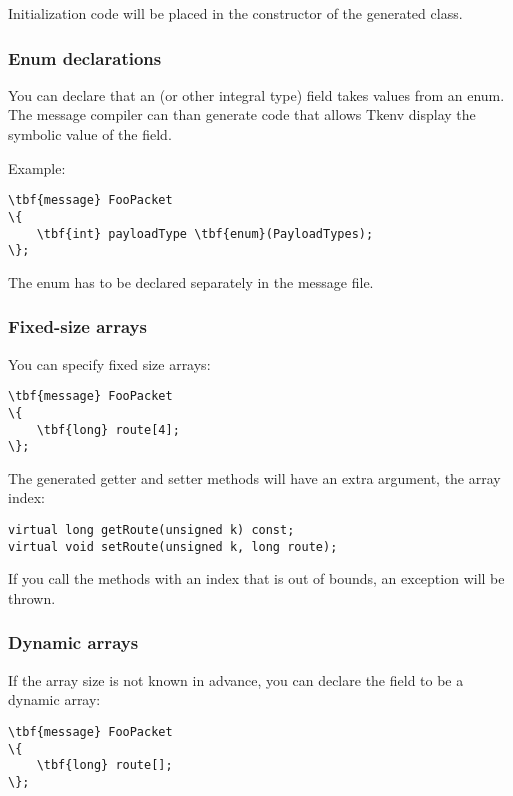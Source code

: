Initialization code will be placed in the constructor of the generated class.


\subsubsection{Enum declarations}

You can declare that an  (or other integral type) field
takes values from an enum. The message compiler can than generate code
that allows Tkenv display the symbolic value of the field.

Example:

\begin{Verbatim}[commandchars=\\\{\}]
\tbf{message} FooPacket
\{
    \tbf{int} payloadType \tbf{enum}(PayloadTypes);
\};
\end{Verbatim}

The enum has to be declared separately in the message file.


\subsubsection{Fixed-size arrays}

You can specify fixed size arrays:

\begin{Verbatim}[commandchars=\\\{\}]
\tbf{message} FooPacket
\{
    \tbf{long} route[4];
\};
\end{Verbatim}

The generated getter and setter methods will have an extra  argument,
the array index:

\begin{verbatim}
virtual long getRoute(unsigned k) const;
virtual void setRoute(unsigned k, long route);
\end{verbatim}

If you call the methods with an index that is out of bounds, an exception
will be thrown.


\subsubsection{Dynamic arrays}

If the array size is not known in advance, you can declare the field
to be a dynamic array:

\begin{Verbatim}[commandchars=\\\{\}]
\tbf{message} FooPacket
\{
    \tbf{long} route[];
\};
\end{Verbatim}

